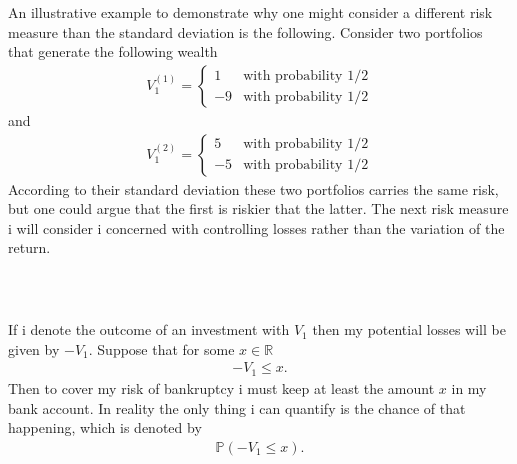 \documentclass{beamer}
\numberwithin{equation}{section}
\begin{document}
\begin{frame}\frametitle{{\normalsize \secname} \\ {\large \subsecname}}
    An illustrative example to demonstrate why one might consider a different risk measure than the standard deviation is the following.
    Consider two portfolios that generate the following wealth
    \begin{align}
        V_1^{(1)} = 
        \begin{cases}
            1 &\text{with probability $1/2$} \\
            -9 &\text{with probability $1/2$}
        \end{cases}
    \end{align}
    and
    \begin{align}
        V_1^{(2)} = 
        \begin{cases}
            5 &\text{with probability $1/2$} \\
            -5 &\text{with probability $1/2$}
        \end{cases}
    \end{align}
    According to their standard deviation these two portfolios carries the same risk, but one could argue that the first is riskier that the latter.
    The next risk measure i will consider i concerned with controlling losses rather than the variation of the return.
\end{frame}

\begin{frame}\frametitle{{\normalsize \secname} \\ {\large \subsecname}}
    If i denote the outcome of an investment with $V_1$ then my potential losses will be given by $-V_1$.
    Suppose that for some $x \in \mathbb{R}$
    \begin{align}
        -V_1 \leq x.
    \end{align}
    Then to cover my risk of bankruptcy i must keep at least the amount $x$ in my bank account.
    In reality the only thing i can quantify is the chance of that happening, which is denoted by
    \begin{align}
        \mathbb{P}\left( -V_1 \leq x \right).
    \end{align}
\end{frame}
\end{document}
